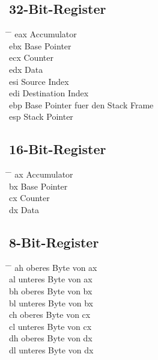 \documentclass[a4paper,12pt,twoside]{article}
\begin{document}
\subsection{32-Bit-Register}
\begin{tabbing}
  \hspace{2mm} \= \hspace{50mm} \= \kill 
  \> eax \> Accumulator \\ 
  \> ebx \> Base Pointer \\ 
  \> ecx \> Counter \\ 
  \> edx \> Data \\ 
  \> esi \> Source Index \\ 
  \> edi \> Destination Index \\ 
  \> ebp \> Base Pointer fuer den Stack Frame \\ 
  \> esp \> Stack Pointer \\
\end{tabbing}
\subsection{16-Bit-Register}
\begin{tabbing}
  \hspace{2mm} \= \hspace{50mm} \= \kill 
  \> ax \> Accumulator \\ 
  \> bx \> Base Pointer \\ 
  \> cx \> Counter \\ 
  \> dx \> Data \\ 
\end{tabbing}
\subsection{8-Bit-Register}
\begin{tabbing}
  \hspace{2mm} \= \hspace{50mm} \= \kill 
  \> ah \> oberes Byte von ax \\ 
  \> al \> unteres Byte von ax \\ 
  \> bh \> oberes Byte von bx \\ 
  \> bl \> unteres Byte von bx \\ 
  \> ch \> oberes Byte von cx \\ 
  \> cl \> unteres Byte von cx \\ 
  \> dh \> oberes Byte von dx \\ 
  \> dl \> unteres Byte von dx \\ 
\end{tabbing}
\end{document}

